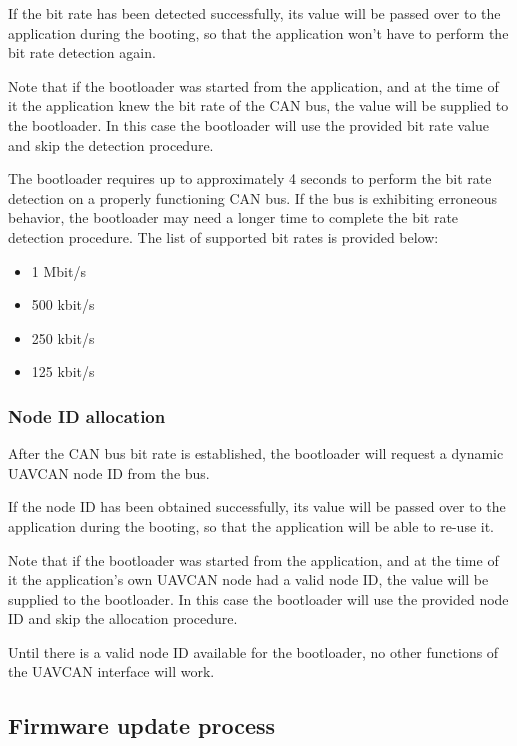 \documentclass{zubaxdoc}
\begin{document}
If the bit rate has been detected successfully, its value will be passed over to the application
during the booting, so that the application won't have to perform the bit rate detection again.

Note that if the bootloader was started from the application,
and at the time of it the application knew the bit rate of the CAN bus,
the value will be supplied to the bootloader.
In this case the bootloader will use the provided bit rate value and skip the detection procedure.

The bootloader requires up to approximately 4 seconds to perform the bit rate detection on a properly
functioning CAN bus.
If the bus is exhibiting erroneous behavior, the bootloader may need a longer time to complete the bit rate
detection procedure.
The list of supported bit rates is provided below:
\begin{itemize}
    \item 1 Mbit/s
    \item 500 kbit/s
    \item 250 kbit/s
    \item 125 kbit/s
\end{itemize}

\subsubsection{Node ID allocation}\label{sec:bootloader_uavcan_node_id_allocation}

After the CAN bus bit rate is established, the bootloader will request a dynamic UAVCAN node ID from the bus.

If the node ID has been obtained successfully, its value will be passed over to the application
during the booting, so that the application will be able to re-use it.

Note that if the bootloader was started from the application,
and at the time of it the application's own UAVCAN node had a valid node ID,
the value will be supplied to the bootloader.
In this case the bootloader will use the provided node ID and skip the allocation procedure.

Until there is a valid node ID available for the bootloader,
no other functions of the UAVCAN interface will work.

\subsection{Firmware update process}
\end{document}
